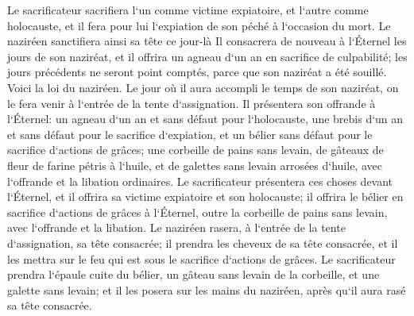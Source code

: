 \verse Le sacrificateur sacrifiera l`un comme victime expiatoire, et l`autre comme holocauste, et il fera pour lui l`expiation de son péché à l`occasion du mort. Le naziréen sanctifiera ainsi sa tête ce jour-là 
\verse Il consacrera de nouveau à l`Éternel les jours de son naziréat, et il offrira un agneau d`un an en sacrifice de culpabilité; les jours précédents ne seront point comptés, parce que son naziréat a été souillé. 
\verse Voici la loi du naziréen. Le jour où il aura accompli le temps de son naziréat, on le fera venir à l`entrée de la tente d`assignation. 
\verse Il présentera son offrande à l`Éternel: un agneau d`un an et sans défaut pour l`holocauste, une brebis d`un an et sans défaut pour le sacrifice d`expiation, et un bélier sans défaut pour le sacrifice d`actions de grâces; 
\verse une corbeille de pains sans levain, de gâteaux de fleur de farine pétris à l`huile, et de galettes sans levain arrosées d`huile, avec l`offrande et la libation ordinaires. 
\verse Le sacrificateur présentera ces choses devant l`Éternel, et il offrira sa victime expiatoire et son holocauste; 
\verse il offrira le bélier en sacrifice d`actions de grâces à l`Éternel, outre la corbeille de pains sans levain, avec l`offrande et la libation. 
\verse Le naziréen rasera, à l`entrée de la tente d`assignation, sa tête consacrée; il prendra les cheveux de sa tête consacrée, et il les mettra sur le feu qui est sous le sacrifice d`actions de grâces. 
\verse Le sacrificateur prendra l`épaule cuite du bélier, un gâteau sans levain de la corbeille, et une galette sans levain; et il les posera sur les mains du naziréen, après qu`il aura rasé sa tête consacrée. 
